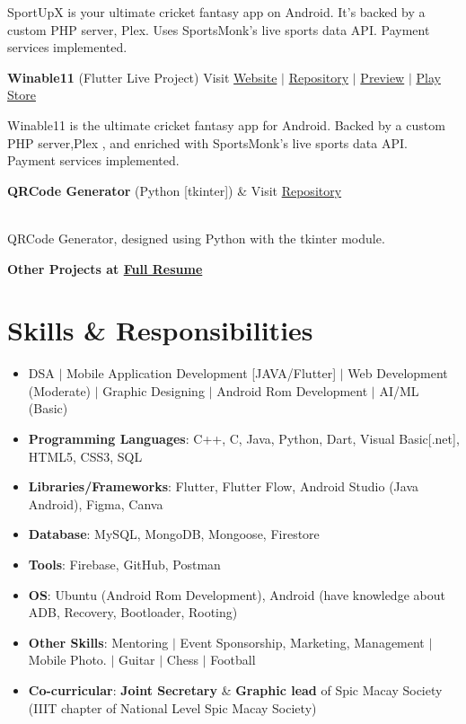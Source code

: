 \documentclass[letterpaper,11pt]{article}
\newcommand{\resumeItem}[1]{
  \item\small{
    {#1 \vspace{-2pt}}
  }
}
\newcommand{\resumeItemListStart}{\begin{itemize}}
\newcommand{\resumeItemListEnd}{\end{itemize}\vspace{-5pt}}
\begin{document}
\begin{itemize}
{    {SportUpX is your ultimate cricket fantasy app on Android. It's backed by a custom PHP server, Plex. Uses SportsMonk's live sports data API. Payment services implemented.}
    }
     
     \item{
     \textbf{Winable11}{ (Flutter Live Project)} \hfill {Visit 
     \href{https://winable11.com/} {Website} {$|$} 
     \href{https://github.com/Decrypton-Private-Limited/winable11.git} {Repository}} {$|$} 
     \href{preview link } {Preview} {$|$} 
     \href{https://play.google.com/store/apps/details?id=com.winable.winable&pcampaignid=web_share} {Play Store}

    {Winable11 is the ultimate cricket fantasy app for Android. Backed by a custom PHP server,Plex , and enriched with SportsMonk's live sports data API. Payment services implemented. 
 

    \item{
     \textbf{QRCode Generator}{ (Python [tkinter])} & \hfill {Visit 
     \href{https://github.com/Swagnik02/QR-Code-Generator-using-tkinter-python-.git} {Repository}}
    
  } \\[3.75pt]
    {QRCode Generator, designed using Python with the tkinter module.}

      \textbf{Other Projects at \href{https://drive.google.com/file/d/1iZpZd5xkI__fTyGOcxyd2_2q-D1lMlvN/view?usp=sharing} {Full Resume}}
    }}
\end{itemize}

\section{Skills \& Responsibilities}
\resumeItemListStart
 \resumeItem{DSA $|$ Mobile Application Development [JAVA/Flutter] $|$ Web Development (Moderate) $|$ Graphic Designing $|$ Android Rom Development $|$ AI/ML (Basic) }
            \resumeItem{
            
            \textbf{Programming Languages}{: C++, C, Java, Python, Dart,  Visual Basic[.net], HTML5, CSS3, SQL}}
            \resumeItem{
            \textbf{Libraries/Frameworks}{: Flutter, Flutter Flow, Android Studio (Java Android), Figma, Canva}}
            \resumeItem{
            \textbf{Database}{: MySQL, MongoDB, Mongoose, Firestore}}
            \resumeItem{
            \textbf{Tools}{: Firebase, GitHub, Postman}}
            \resumeItem{
            \textbf{OS}{: Ubuntu (Android Rom Development), Android (have knowledge about ADB, Recovery, Bootloader, Rooting)}}
            \resumeItem{
            \textbf{Other Skills}{: Mentoring $|$ Event Sponsorship, Marketing, Management $|$ Mobile Photo. $|$ Guitar $|$ Chess $|$ Football}}
            \resumeItem
            {\textbf{Co-curricular}{:}\textbf{ Joint Secretary} \& \textbf{Graphic lead} of Spic Macay Society (IIIT chapter of National Level Spic Macay Society)}
\resumeItemListEnd
\end{document}
